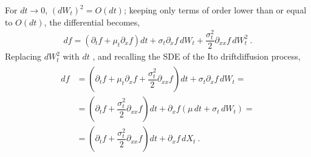 \documentclass[letterpaper,10pt,english]{jupyterBook}
\begin{document}
\sphinxAtStartPar
For \(dt \rightarrow 0\), \(\left(d W_t\right)^2 = O(dt)\); keeping only terms of order lower than or equal to \(O(dt)\), the differential becomes,
\begin{equation*}
\begin{split}df = \left( \partial_t f + \mu_t \partial_x f  \right) dt + \sigma_t \partial_x f \, d W_t + \dfrac{\sigma_t^2}{2} \partial_{xx} f \, dW_t^2 \ .\end{split}
\end{equation*}
\sphinxAtStartPar
Replacing \(dW_t^2\) with \(d t\)  , and recalling the SDE of the Ito drift\sphinxhyphen{}diffusion process,
\begin{equation*}
\begin{split}\begin{aligned}
  df
  & = \left( \partial_t f + \mu_t \partial_x f + \dfrac{\sigma_t^2}{2} \partial_{xx} f \right) dt + \sigma_t \partial_x f \, d W_t = \\
  & = \left( \partial_t f +  \dfrac{\sigma_t^2}{2} \partial_{xx} f \right) dt + \partial_x f \left( \mu \, dt + \sigma_t \, d W_t \right) = \\
  & = \left( \partial_t f +  \dfrac{\sigma_t^2}{2} \partial_{xx} f \right) dt + \partial_x f \, dX_t \ .
\end{aligned}\end{split}
\end{equation*}
\end{document}
